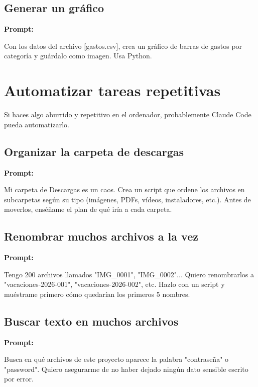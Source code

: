 \documentclass[11pt,a4paper]{report}
\begin{document}
\subsection{Generar un gráfico}

\noindent\textbf{Prompt: }
\begin{codebox}
Con los datos del archivo [gastos.csv], crea un gráfico de barras de gastos por categoría y guárdalo como imagen. Usa Python.
\end{codebox}

\section{ Automatizar tareas repetitivas}

Si haces algo aburrido y repetitivo en el ordenador, probablemente Claude Code pueda automatizarlo.

\subsection{Organizar la carpeta de descargas}

\noindent\textbf{Prompt: }
\begin{codebox}
Mi carpeta de Descargas es un caos. Crea un script que ordene los archivos en subcarpetas según su tipo (imágenes, PDFs, vídeos, instaladores, etc.). Antes de moverlos, enséñame el plan de qué iría a cada carpeta.
\end{codebox}

\subsection{Renombrar muchos archivos a la vez}

\noindent\textbf{Prompt: }
\begin{codebox}
Tengo 200 archivos llamados "IMG_0001", "IMG_0002"... Quiero renombrarlos a "vacaciones-2026-001", "vacaciones-2026-002", etc. Hazlo con un script y muéstrame primero cómo quedarían los primeros 5 nombres.
\end{codebox}

\subsection{Buscar texto en muchos archivos}

\noindent\textbf{Prompt: }
\begin{codebox}
Busca en qué archivos de este proyecto aparece la palabra "contraseña" o "password". Quiero asegurarme de no haber dejado ningún dato sensible escrito por error.
\end{codebox}
\end{document}
